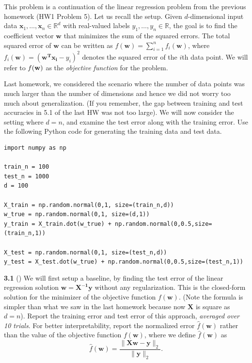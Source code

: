 This problem is a continuation of the linear regression problem from the previous homework (HW1 Problem 5). Let us recall the setup. Given
$d$-dimensional input data
$\textbf{x}_1,\ldots, \textbf{x}_n \in \mathbb{R}^d$ with
real-valued labels $y_1,\ldots, y_n \in \mathbb{R}$, the goal
is to find the coefficient vector $\textbf{w}$ that minimizes the sum
of the squared errors.  The total squared error of $\mathbf{w}$ can be
written as
$f(\mathbf{w})=\sum_{i=1}^{n}f_i(\mathbf{w})$, where
$f_i(\mathbf{w})=(\mathbf{w^T x_i}-y_i)^2$ denotes the
squared error of the $i$th data point. We will refer to $f(\mathbf{w})$ as the \emph{objective function} for the problem.

Last homework, we considered the scenario where the number of data points was much larger than the number of dimensions and
hence we did not worry too much about generalization. (If you remember, the gap between training and test accuracies in 5.1 of the last HW was not too large).  We will
now consider the setting where $d=n$, and examine the test error along
with the training error. Use the following Python code for generating
the training data and test data.

\begin{verbatim}
import numpy as np

train_n = 100
test_n = 1000
d = 100

X_train = np.random.normal(0,1, size=(train_n,d))
w_true = np.random.normal(0,1, size=(d,1))
y_train = X_train.dot(w_true) + np.random.normal(0,0.5,size=(train_n,1))

X_test = np.random.normal(0,1, size=(test_n,d))
y_test = X_test.dot(w_true) + np.random.normal(0,0.5,size=(test_n,1))

\end{verbatim}

\textbf{3.1} () We will first setup a baseline, by finding the test
  error of the linear regression solution
  $\textbf{w}=\mathbf{X^{-1}y}$ without any regularization.  This is
  the closed-form solution for the minimizer of the objective function
  $f(\mathbf{w})$.  (Note the formula is simpler than what we saw in the last homework because
  now $\mathbf{X}$ is square as $d=n$).  Report the training error and test
  error of this approach, \emph{averaged over 10 trials}. For better
  interpretability, report the normalized error
  $\hat{f}(\textbf{w})$ rather than the value of the objective function
  ${f}(\textbf{w})$, where we define $\hat{f}(\textbf{w})$ as
\[ 
\hat{f}(\textbf{w})=\frac{\parallel{\mathbf{Xw-y}}\parallel_2}{\parallel{\mathbf{y}}\parallel_2}.
\]

